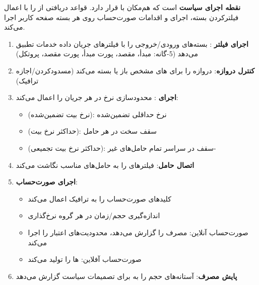 

\CNchained{}

 \textbf{نقطه اجرای سیاست} است که هم‌مکان با  قرار دارد. قواعد  دریافتی از  را با اعمال فیلترکردن بسته، اجرای  و اقدامات صورت‌حساب روی هر بسته صفحه کاربر اجرا می‌کند.


\begin{enumerate}
\def\labelenumi{\arabic{enumi}.}
\tightlist
\item
  \textbf{اجرای فیلتر }: بسته‌های  ورودی/\allowbreak{}خروجی را با فیلترهای جریان داده خدمات تطبیق می‌دهد (5-گانه:  مبدأ،  مقصد، پورت مبدأ، پورت مقصد، پروتکل)
\item
  \textbf{کنترل دروازه}: دروازه را برای های مشخص باز یا بسته می‌کند (مسدودکردن/\allowbreak{}اجازه ترافیک)
\item
  \textbf{اجرای }: محدودسازی نرخ در هر جریان را اعمال می‌کند:

  \begin{itemize}
  \tightlist
  \item
     (نرخ بیت تضمین‌شده): نرخ حداقلی تضمین‌شده
  \item
     (حداکثر نرخ بیت): سقف سخت در هر حامل
  \item
     (حداکثر نرخ بیت تجمیعی): سقف در سراسر تمام حامل‌های غیر-
  \end{itemize}
\item
  \textbf{اتصال حامل}: فیلترهای  را به حامل‌های  مناسب نگاشت می‌کند
\item
  \textbf{اجرای صورت‌حساب}:

  \begin{itemize}
  \tightlist
  \item
    کلیدهای صورت‌حساب را به ترافیک اعمال می‌کند
  \item
    اندازه‌گیری حجم/\allowbreak{}زمان در هر گروه نرخ‌گذاری
  \item
    صورت‌حساب آنلاین: مصرف را گزارش می‌دهد، محدودیت‌های اعتبار را اجرا می‌کند
  \item
    صورت‌حساب آفلاین: ها را تولید می‌کند
  \end{itemize}
\item
  \textbf{پایش مصرف}: آستانه‌های حجم را به  برای تصمیمات سیاست گزارش می‌دهد
\end{enumerate}


